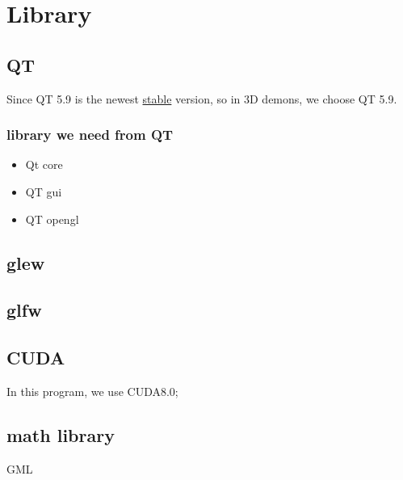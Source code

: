 

\chapter{Library}

\section {QT}

Since QT 5.9 is the newest  
\href{http://blog.qt.io/blog/2017/05/31/qt-5-9-released/}{ stable} version, so in 3D demons, we choose QT 5.9.

\subsection{library we need from QT}
\begin{itemize}
	\item Qt core
	\item QT gui
	\item QT opengl
\end{itemize}






\section{glew}






\section{glfw}

\section{CUDA}

In this program, we use CUDA8.0;

\section{math library}

GML